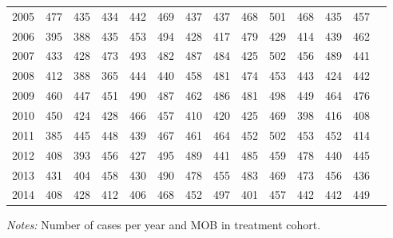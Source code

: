 \begin{table}[H]
\begin{threeparttable}
{\begin{tabular}{l*{13}{c}}
2005        &         477&         435&         434&         442&         469&         437&         437&         468&         501&         468&         435&         457\\
2006        &         395&         388&         435&         453&         494&         428&         417&         479&         429&         414&         439&         462\\
2007        &         433&         428&         473&         493&         482&         487&         484&         425&         502&         456&         489&         441\\
2008        &         412&         388&         365&         444&         440&         458&         481&         474&         453&         443&         424&         442\\
2009        &         460&         447&         451&         490&         487&         462&         486&         481&         498&         449&         464&         476\\
2010        &         450&         424&         428&         466&         457&         410&         420&         425&         469&         398&         416&         408\\
2011        &         385&         445&         448&         439&         467&         461&         464&         452&         502&         453&         452&         414\\
2012        &         408&         393&         456&         427&         495&         489&         441&         485&         459&         478&         440&         445\\
2013        &         431&         404&         458&         430&         490&         478&         455&         483&         469&         473&         456&         436\\
2014        &         408&         428&         412&         406&         468&         452&         497&         401&         457&         442&         442&         449\\
 \bottomrule \end{tabular} } \begin{tablenotes} \item \scriptsize \emph{Notes:} Number of cases per year and MOB in treatment cohort. \end{tablenotes} \end{threeparttable} \end{table} 

